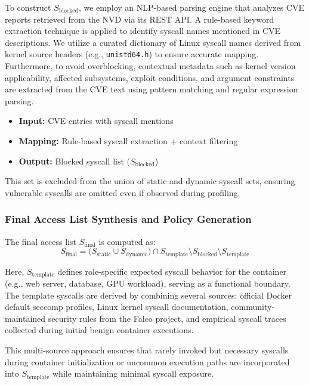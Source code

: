To construct $S_{\text{blocked}}$, we employ an NLP-based parsing engine that analyzes CVE
reports retrieved from the NVD via its REST API. A rule-based keyword extraction technique is
applied to identify syscall names mentioned in CVE descriptions. We utilize a curated dictionary
of Linux syscall names derived from kernel source headers (e.g., \texttt{unistd64.h}) to ensure
accurate mapping. Furthermore, to avoid overblocking, contextual metadata such as kernel version
applicability, affected subsystems, exploit conditions, and argument constraints are extracted
from the CVE text using pattern matching and regular expression parsing.

\begin{itemize}
  \item \textbf{Input:} CVE entries with syscall mentions
  \item \textbf{Mapping:} Rule-based syscall extraction + context filtering
  \item \textbf{Output:} Blocked syscall list ($S_{\text{blocked}}$)
\end{itemize}

This set is excluded from the union of static and dynamic syscall sets, ensuring vulnerable
syscalls are omitted even if observed during profiling.

\subsubsection{Final Access List Synthesis and Policy Generation}
\label{subsubsec:synthesis}

The final access list $S_{\text{final}}$ is computed as:
\begin{equation}
  S_{\text{final}} = \bigl(S_{\text{static}} \cup S_{\text{dynamic}}\bigr)
                      \cap S_{\text{template}}
                      \setminus S_{\text{blocked}}
                      \setminus S_{\text{template}}
  \label{eq:sfinal}
\end{equation}

Here, $S_{\text{template}}$ defines role-specific expected syscall behavior for the container
(e.g., web server, database, GPU workload), serving as a functional boundary. The template
syscalls are derived by combining several sources: official Docker default seccomp profiles,
Linux kernel syscall documentation, community-maintained security rules from the Falco project,
and empirical syscall traces collected during initial benign container executions.

This multi-source approach ensures that rarely invoked but necessary syscalls during container
initialization or uncommon execution paths are incorporated into $S_{\text{template}}$ while
maintaining minimal syscall exposure.

